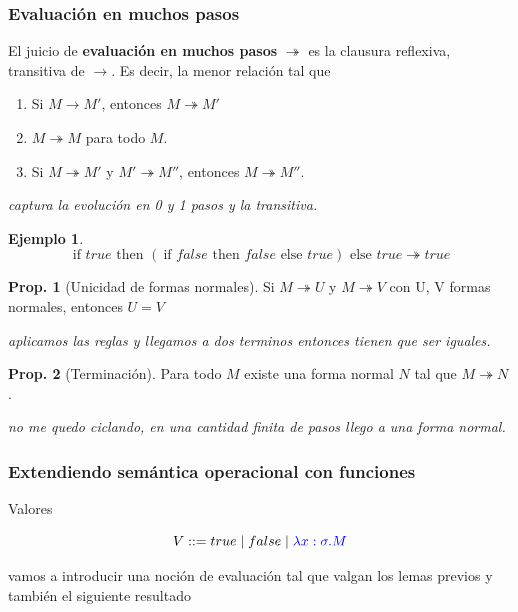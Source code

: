 \documentclass{report}
\theoremstyle{definition} %
\newtheorem{proposition}{Prop.}[chapter]
\newtheorem*{example*}{Ejemplo}
\newcommand{\ifte}[3]{\ \text{if } #1 \text{ then } #2 \text{ else } #3}
\newcommand{\abs}[3]{\lambda #1 : #2 . #3}
\newcommand{\reduces}{\to}
\newcommand{\reduce}[2]{#1 \reduces #2}
\newcommand{\reduceManyTo}{\twoheadrightarrow}
\newcommand{\reduceMany}[2]{#1 \reduceManyTo #2}
\begin{document}
\subsubsection{Evaluación en muchos pasos}

El juicio de \textbf{evaluación en muchos pasos} $\reduceManyTo$ es la
clausura reflexiva, transitiva de $\to$. Es decir, la menor relación tal que

\begin{enumerate}
    \item Si $\reduce{M}{M'}$, entonces $\reduceMany{M}{M'}$
    \item $\reduceMany{M}{M}$ para todo $M$.
    \item Si $\reduceMany{M}{M'}$ y $\reduceMany{M'}{M''}$, entonces $\reduceMany{M}{M''}$.
\end{enumerate}

\textit{captura la evolución en 0 y 1 pasos y la transitiva.}

\begin{example*}
    \[
    \reduceMany
        {\ifte{true}{(\ifte{false}{false}{true})}{true}}
        {true}
    \]
\end{example*}

\begin{proposition}[Unicidad de formas normales]
    Si $\reduceMany{M}{U}$ y $\reduceMany{M}{V}$ con U, V formas normales,
    entonces $U = V$

    \textit{aplicamos las reglas y llegamos a dos terminos entonces tienen que
    ser iguales.}
\end{proposition}

\begin{proposition}[Terminación]
    Para todo $M$ existe una forma normal $N$ tal que $\reduceMany{M}{N}$.

    \textit{no me quedo ciclando, en una cantidad finita de pasos llego a una forma normal.}
\end{proposition}

\subsubsection{Extendiendo semántica operacional con funciones}

Valores

\[
    V ::= true \mid false \mid \textcolor{blue}{\abs{x}{\sigma}{M}}
\]

vamos a introducir una noción de evaluación tal que valgan los lemas previos y
también el siguiente resultado
\end{document}
